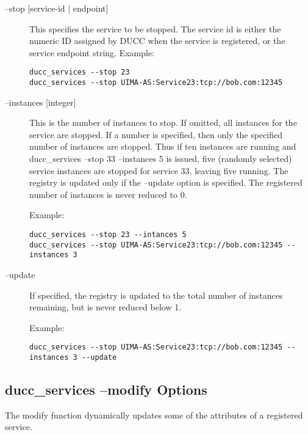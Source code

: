     \begin{description}

  \item[--stop {[service-id | endpoint]}] This specifies the service to be stopped. The service id
         is either the numeric ID assigned by DUCC when the service is registered, or the service
         endpoint string. Example:
\begin{verbatim}
ducc_services --stop 23 
ducc_services --stop UIMA-AS:Service23:tcp://bob.com:12345 
\end{verbatim}
         
       \item[--instances {[integer]}] This is the number of instances to stop. If omitted, all
         instances for the service are stopped.  If a number is specified, then only the specified
         number of instances are stopped. Thus if ten instances are running and ducc\_services --stop
         33 --instances 5 is issued, five (randomly selected) service instances are stopped for
         service 33, leaving five running.  The registry is updated only if the --update option is
         specified. The registered number of instances is never reduced to 0.

         Example: 
\begin{verbatim}
ducc_services --stop 23 --intances 5 
ducc_services --stop UIMA-AS:Service23:tcp://bob.com:12345 --instances 3  
\end{verbatim}

       \item[--update] If specified, the registry is updated to the total number of instances
         remaining, but is never reduced below 1.

         Example: 
\begin{verbatim}
ducc_services --stop UIMA-AS:Service23:tcp://bob.com:12345 --instances 3 --update
\end{verbatim}

    \end{description}

    \subsection{ducc\_services --modify Options}
    The modify function dynamically updates some of the attributes of a registered service. 
    
